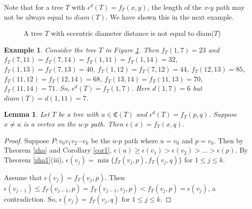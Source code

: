 \documentclass[11pt]{article}
\newtheorem{lemma}[theorem]{Lemma}
\newtheorem{example}[theorem]{Example}
\begin{document}
Note that for a tree $T$ with $\epsilon^d(T)=f_T(x,y)$,  the length of the $x$-$y$ path may not be always equal to $diam(T)$. We have shown this in the next example.
\begin{figure}[h]
    \centering
\caption{A tree $T$ with eccentric diameter distance is not equal to diam($T$)}\label{fig1}
\end{figure}
\begin{example}
Consider the tree $T$ in Figure \ref{fig1}. Then $f_T(1,7)=23$ and $f_T(7,11)=f_T(7,14)=f_T(1,11)=f_T(1,14)=32$, $f_T(1,13)=f_T(7,13)=40$, $f_T(1,12)=f_T(7,12)=44$, $f_T(12,13)=85$, $f_T(11,12)=f_T(12,14)=68$, $f_T(13,14)=f_T(11,13)=70$, $f_T(11,14)=71$.   So, $\epsilon^d(T)=f_T(1,7)$. Here  $d(1,7)=6$ but $diam(T)=d(1,11)=7$.
\end{example} 
 
\begin{lemma}\label{lem1}
Let $T$ be a tree with $u\in \mathfrak{C}(T)$ and $\epsilon^d(T)=f_T(p,q)$. Suppose $x\neq u$ is a vertex on the $u$-$p$ path. Then $\epsilon(x)=f_T(x,q).$ 
\end{lemma}
\begin{proof}
Suppose $P:v_0v_1v_2\cdots  v_k$ be the $u$-$p$ path where $u=v_0$ and $p=v_k$. Then by Theorem \ref{zha} and Corollary \ref{cor1}, $\epsilon(u)\geq  \epsilon(v_1)>\epsilon(v_2)>\dots >\epsilon(p)$. By Theorem \ref{zha1}(iii), $\epsilon(v_j)=\min\{f_T(v_j,p),f_T(v_j,q)\}$ for $1\leq j \leq k$. 

Assume that $\epsilon(v_j)=f_T(v_j,p)$. Then $\epsilon(v_{j-1})\leq f_T(v_{j-1},p)=f_T(v_{j-1},v_j,p)<f_T(v_j,p)=\epsilon(v_j)$,  a contradiction. So, $\epsilon(v_j)=f_T(v_j,q)$ for $1\leq j \leq k$.
\end{proof}
\end{document}
